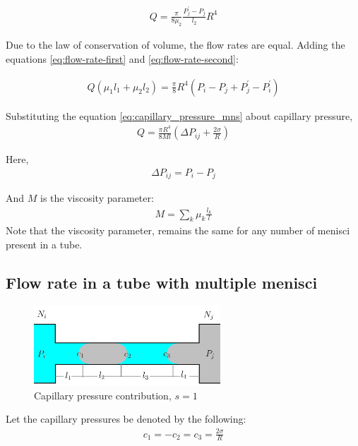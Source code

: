 \documentclass{crm-article}
\begin{document}
		\begin{gather} \label{eq:flow-rate-second}
			Q = \frac{\pi}{8{\mu}_2} \frac{P^{'}_j - P_j}{l_2} R^4
		\end{gather}
		
		Due to the law of conservation of volume, the flow rates are equal. Adding the equations \ref{eq:flow-rate-first} and \ref{eq:flow-rate-second}:
		
		\begin{gather} \label{eq:flow-rate-intermediate}
			Q({\mu}_1 l_1 + {\mu}_2 l_2) = \frac{\pi}{8}R^4(P_i - P_j + P^{'}_j - P^{'}_i)
		\end{gather}
		
		Substituting the equation \ref{eq:capillary_pressure_mns} about capillary pressure,
		\begin{gather} \label{eq:flow-rate-1mns-basic-m}
			Q = \frac{\pi R^4}{8Ml} \left( \Delta P_{ij} + \frac{2\sigma}{R} \right)
		\end{gather}
		
		Here,
		\begin{gather} \label{eq:def-pressure-difference} 
			\Delta P_{ij} = P_{i} - P_{j}
		\end{gather}
		
		And $M$ is the viscosity parameter:
		\begin{gather}
			M = \sum_{k} \mu_{k} \frac{l_{k}}{l}
		\end{gather}
		Note that the viscosity parameter, remains the same for any number of menisci present in a tube.
		
		\subsection{Flow rate in a tube with multiple menisci} \label{sec:multi-menisci-flow-rate}
		\begin{figure}[H]
			\centering
			\includegraphics[height=3cm]{fig_capillary_pressure_in_tube_3mns}
			\caption{Capillary pressure contribution, $s = 1$}
			\label{fig:capillary_pressure_in_tube_3mns}
		\end{figure}
		
		Let the capillary pressures be denoted by the following:
		\begin{gather}
			c_1 = -c_2 = c_3 = \frac{2 \sigma}{R}
		\end{gather}
		
\end{document}
